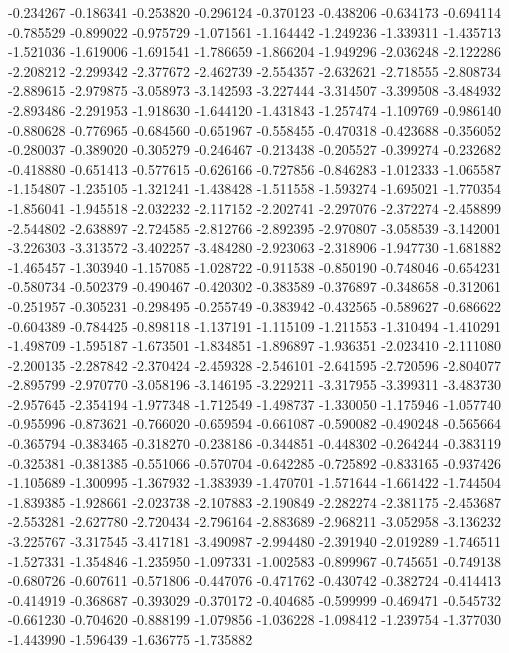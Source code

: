 -0.234267
-0.186341
-0.253820
-0.296124
-0.370123
-0.438206
-0.634173
-0.694114
-0.785529
-0.899022
-0.975729
-1.071561
-1.164442
-1.249236
-1.339311
-1.435713
-1.521036
-1.619006
-1.691541
-1.786659
-1.866204
-1.949296
-2.036248
-2.122286
-2.208212
-2.299342
-2.377672
-2.462739
-2.554357
-2.632621
-2.718555
-2.808734
-2.889615
-2.979875
-3.058973
-3.142593
-3.227444
-3.314507
-3.399508
-3.484932
-2.893486
-2.291953
-1.918630
-1.644120
-1.431843
-1.257474
-1.109769
-0.986140
-0.880628
-0.776965
-0.684560
-0.651967
-0.558455
-0.470318
-0.423688
-0.356052
-0.280037
-0.389020
-0.305279
-0.246467
-0.213438
-0.205527
-0.399274
-0.232682
-0.418880
-0.651413
-0.577615
-0.626166
-0.727856
-0.846283
-1.012333
-1.065587
-1.154807
-1.235105
-1.321241
-1.438428
-1.511558
-1.593274
-1.695021
-1.770354
-1.856041
-1.945518
-2.032232
-2.117152
-2.202741
-2.297076
-2.372274
-2.458899
-2.544802
-2.638897
-2.724585
-2.812766
-2.892395
-2.970807
-3.058539
-3.142001
-3.226303
-3.313572
-3.402257
-3.484280
-2.923063
-2.318906
-1.947730
-1.681882
-1.465457
-1.303940
-1.157085
-1.028722
-0.911538
-0.850190
-0.748046
-0.654231
-0.580734
-0.502379
-0.490467
-0.420302
-0.383589
-0.376897
-0.348658
-0.312061
-0.251957
-0.305231
-0.298495
-0.255749
-0.383942
-0.432565
-0.589627
-0.686622
-0.604389
-0.784425
-0.898118
-1.137191
-1.115109
-1.211553
-1.310494
-1.410291
-1.498709
-1.595187
-1.673501
-1.834851
-1.896897
-1.936351
-2.023410
-2.111080
-2.200135
-2.287842
-2.370424
-2.459328
-2.546101
-2.641595
-2.720596
-2.804077
-2.895799
-2.970770
-3.058196
-3.146195
-3.229211
-3.317955
-3.399311
-3.483730
-2.957645
-2.354194
-1.977348
-1.712549
-1.498737
-1.330050
-1.175946
-1.057740
-0.955996
-0.873621
-0.766020
-0.659594
-0.661087
-0.590082
-0.490248
-0.565664
-0.365794
-0.383465
-0.318270
-0.238186
-0.344851
-0.448302
-0.264244
-0.383119
-0.325381
-0.381385
-0.551066
-0.570704
-0.642285
-0.725892
-0.833165
-0.937426
-1.105689
-1.300995
-1.367932
-1.383939
-1.470701
-1.571644
-1.661422
-1.744504
-1.839385
-1.928661
-2.023738
-2.107883
-2.190849
-2.282274
-2.381175
-2.453687
-2.553281
-2.627780
-2.720434
-2.796164
-2.883689
-2.968211
-3.052958
-3.136232
-3.225767
-3.317545
-3.417181
-3.490987
-2.994480
-2.391940
-2.019289
-1.746511
-1.527331
-1.354846
-1.235950
-1.097331
-1.002583
-0.899967
-0.745651
-0.749138
-0.680726
-0.607611
-0.571806
-0.447076
-0.471762
-0.430742
-0.382724
-0.414413
-0.414919
-0.368687
-0.393029
-0.370172
-0.404685
-0.599999
-0.469471
-0.545732
-0.661230
-0.704620
-0.888199
-1.079856
-1.036228
-1.098412
-1.239754
-1.377030
-1.443990
-1.596439
-1.636775
-1.735882
